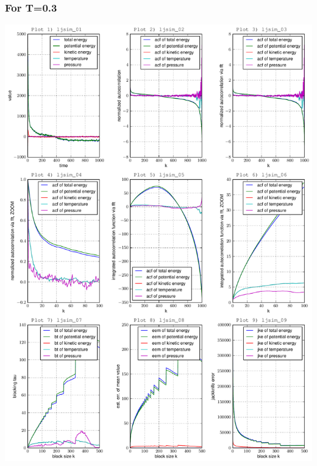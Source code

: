 \documentclass[12pt,a4paper]{scrartcl}
\begin{document}
\subsubsection*{For T=0.3}
\includegraphics[page=1, scale=0.63]{../plots/error03}
\end{document}
